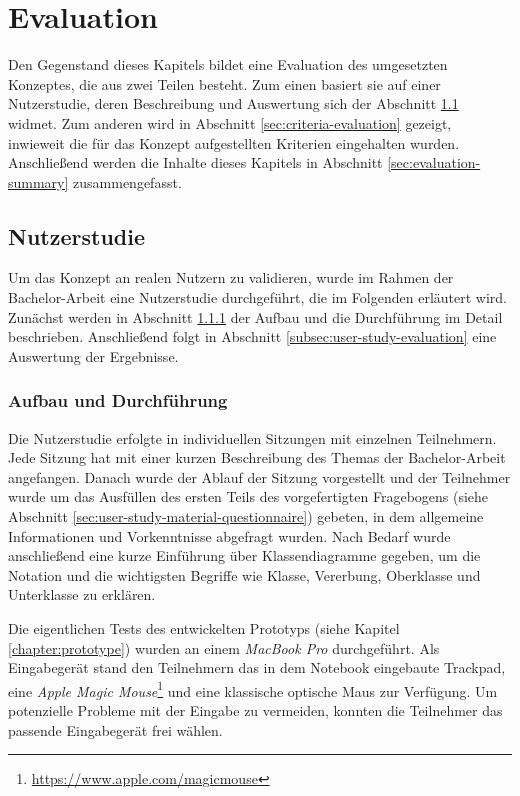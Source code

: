 
\chapter{Evaluation}
\label{chapter:evaluation}

Den Gegenstand dieses Kapitels bildet eine Evaluation des umgesetzten Konzeptes, die aus zwei Teilen besteht. Zum einen basiert sie auf einer Nutzerstudie, deren Beschreibung und Auswertung sich der Abschnitt \ref{sec:user-study} widmet. Zum anderen wird in Abschnitt \ref{sec:criteria-evaluation} gezeigt, inwieweit die für das Konzept aufgestellten Kriterien eingehalten wurden. Anschließend werden die Inhalte dieses Kapitels in Abschnitt \ref{sec:evaluation-summary} zusammengefasst.

\section{Nutzerstudie}
\label{sec:user-study}

Um das Konzept an realen Nutzern zu validieren, wurde im Rahmen der Bachelor-Arbeit eine Nutzerstudie durchgeführt, die im Folgenden erläutert wird. Zunächst werden in Abschnitt \ref{subsec:user-study-setup} der Aufbau und die Durchführung im Detail beschrieben. Anschließend folgt in Abschnitt \ref{subsec:user-study-evaluation} eine Auswertung der Ergebnisse.

\subsection{Aufbau und Durchführung}
\label{subsec:user-study-setup}

Die Nutzerstudie erfolgte in individuellen Sitzungen mit einzelnen Teilnehmern. Jede Sitzung hat mit einer kurzen Beschreibung des Themas der Bachelor-Arbeit angefangen. Danach wurde der Ablauf der Sitzung vorgestellt und der Teilnehmer wurde um das Ausfüllen des ersten Teils des vorgefertigten Fragebogens (siehe Abschnitt \ref{sec:user-study-material-questionnaire}) gebeten, in dem allgemeine Informationen und Vorkenntnisse abgefragt wurden. Nach Bedarf wurde anschließend eine kurze Einführung über Klassendiagramme gegeben, um die Notation und die wichtigsten Begriffe wie Klasse, Vererbung, Oberklasse und Unterklasse zu erklären.

Die eigentlichen Tests des entwickelten Prototyps (siehe Kapitel \ref{chapter:prototype}) wurden an einem \textit{MacBook Pro} durchgeführt. Als Eingabegerät stand den Teilnehmern das in dem Notebook eingebaute Trackpad, eine \textit{Apple Magic Mouse}\footnote{\url{https://www.apple.com/magicmouse}} und eine klassische optische Maus zur Verfügung. Um potenzielle Probleme mit der Eingabe zu vermeiden, konnten die Teilnehmer das passende Eingabegerät frei wählen.

